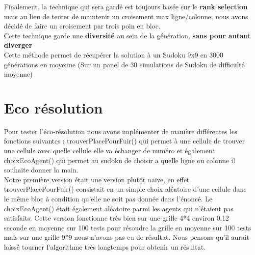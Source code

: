         Finalement, la technique qui sera gardé est toujours basée sur le \textbf{rank selection} mais au lieu de tenter de maintenir un croisement max ligne/colonne, nous avons décidé de faire un croisement par trois poin en bloc.\\
        Cette technique garde une \textbf{diversité} au sein de la génération, \textbf{sans pour autant diverger}\\
        Cette méthode permet de récupérer la solution à un Sudoku 9x9 en 3000 générations en moyenne (Sur un panel de 30 simulations de Sudoku de difficulté moyenne)

    \section{Eco résolution}
	Pour tester l'éco-résolution nous avons implémenter de manière différentes les fonctions suivantes : trouverPlacePourFuir() qui permet à une cellule de trouver une cellule avec quelle cellule elle va échanger de numéro et également choixEcoAgent() qui permet au sudoku de choisir a quelle ligne ou colonne il souhaite donner la main. \\

	Notre première version était une version plutôt naïve, en effet trouverPlacePourFuir() consistait en un simple choix aléatoire d'une cellule dans le même bloc à condition qu'elle ne soit pas donnée dans l'énoncé. Le choixEcoAgent() était également aléatoire parmi les agents qui n'étaient pas satisfaits. Cette version fonctionne très bien sur une grille 4*4 environ 0.12 seconde en moyenne sur 100 tests pour résoudre la grille en moyenne sur 100 tests mais sur une grille 9*9 nous n'avons pas eu de résultat. Nous pensons qu'il aurait laissé tourner l'algorithme très longtemps pour obtenir un résultat. \\
	
